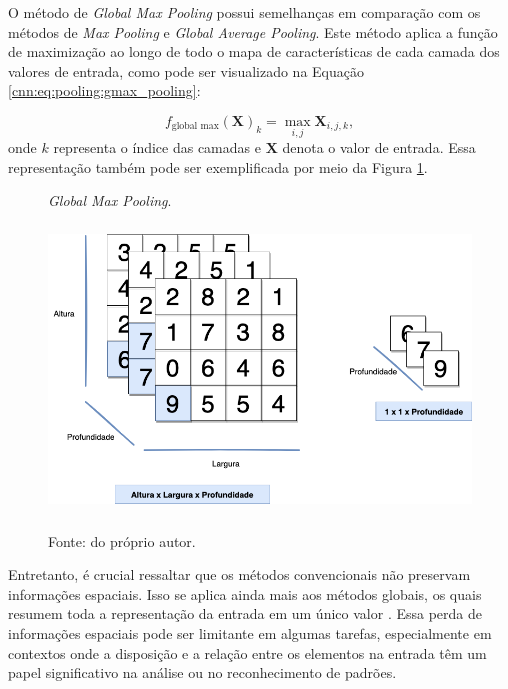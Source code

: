 O método de \textit{Global Max Pooling} possui semelhanças em comparação com os métodos de \textit{Max Pooling} e \textit{Global Average Pooling}. Este método aplica a função de maximização ao longo de todo o mapa de características de cada camada dos valores de entrada, como pode ser visualizado na Equação \ref{cnn:eq:pooling:gmax_pooling}:

\begin{equation}
    \label{cnn:eq:pooling:gmax_pooling}
    f_{\text{global max}}(\boldsymbol{X})_{k} = \max_{i,j}\boldsymbol{X}_{i,j,k},
\end{equation}
onde $k$ representa o índice das camadas e $\boldsymbol{X}$ denota o valor de entrada. Essa representação também pode ser exemplificada por meio da Figura \ref{cnn:fig:gmax_pooling}.

\begin{figure}[H]
    \centering
    \caption{\textit{Global Max Pooling}.}
    \includegraphics[height=3in]{recursos/imagens/deep/global_max_pooling.png}
    \label{cnn:fig:gmax_pooling}
    
    \caption*{Fonte: do próprio autor.}
\end{figure}

Entretanto, é crucial ressaltar que os métodos convencionais não preservam informações espaciais. Isso se aplica ainda mais aos métodos globais, os quais resumem toda a representação da entrada em um único valor \citep{Christlein2019DeepPooling}. Essa perda de informações espaciais pode ser limitante em algumas tarefas, especialmente em contextos onde a disposição e a relação entre os elementos na entrada têm um papel significativo na análise ou no reconhecimento de padrões.

